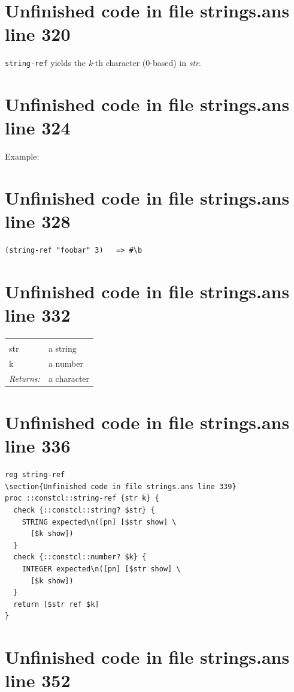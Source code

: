 \documentclass[twoside,9pt]{report}
\begin{document}
\section{Unfinished code in file strings.ans line 320}


\texttt{string-ref} yields the \emph{k}-th character (0-based) in \emph{str}.

\section{Unfinished code in file strings.ans line 324}


Example:

\section{Unfinished code in file strings.ans line 328}
\begin{verbatim}
(string-ref "foobar" 3)   => #\b
\end{verbatim}
\section{Unfinished code in file strings.ans line 332}
\noindent\begin{tabular}{ |p{1.9cm} p{8cm}| }
\hline
\rowcolor[HTML]{CCCCCC} \multicolumn{2}{|l|}{\bf string-ref (public)} \\
str & a string \\
k & a number \\
\textit{Returns:} & a character \\
\hline
\end{tabular}
\section{Unfinished code in file strings.ans line 336}
\begin{lstlisting}
reg string-ref
\section{Unfinished code in file strings.ans line 339}
proc ::constcl::string-ref {str k} {
  check {::constcl::string? $str} {
    STRING expected\n([pn] [$str show] \
      [$k show])
  }
  check {::constcl::number? $k} {
    INTEGER expected\n([pn] [$str show] \
      [$k show])
  }
  return [$str ref $k]
}
\end{lstlisting}
\section{Unfinished code in file strings.ans line 352}
\end{document}
